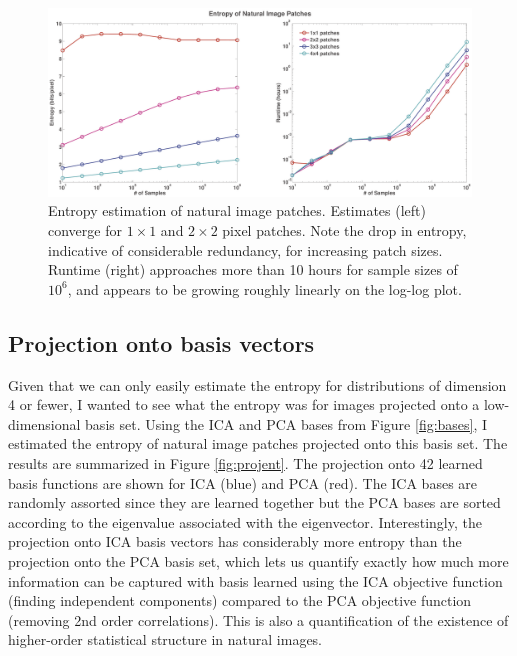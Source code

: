 \documentclass[10pt,twocolumn,letterpaper]{article}
\begin{document}
\begin{figure}[h]
\begin{center}
   \includegraphics[width=1.0\linewidth]{entropy.pdf}
   \caption{Entropy estimation of natural image patches. Estimates (left) converge for $1\times 1$ and $2\times 2$ pixel patches. Note the drop in entropy, indicative of considerable redundancy, for increasing patch sizes. Runtime (right) approaches more than 10 hours for sample sizes of $10^6$, and appears to be growing roughly linearly on the log-log plot.}
\label{fig:entropy}
\end{center}
\end{figure}

\subsection{Projection onto basis vectors}
Given that we can only easily estimate the entropy for distributions of dimension 4 or fewer, I wanted to see what the entropy was for images projected onto a low-dimensional basis set. Using the ICA and PCA bases from Figure \ref{fig:bases}, I estimated the entropy of natural image patches projected onto this basis set. The results are summarized in Figure \ref{fig:projent}. The projection onto 42 learned basis functions are shown for ICA (blue) and PCA (red). The ICA bases are randomly assorted since they are learned together but the PCA bases are sorted according to the eigenvalue associated with the eigenvector. Interestingly, the projection onto ICA basis vectors has considerably more entropy than the projection onto the PCA basis set, which lets us quantify exactly how much more information can be captured with basis learned using the ICA objective function (finding independent components) compared to the PCA objective function (removing 2nd order correlations). This is also a quantification of the existence of higher-order statistical structure in natural images.
\end{document}
